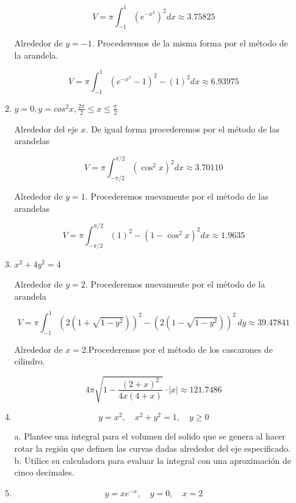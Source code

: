 \documentclass{report}
\begin{document}
\begin{enumerate}[label=\textcolor{Red}{\textbf{\arabic*.}}]
\begin{enumerate}[label=\textcolor{OliveGreen}{\textbf{\arabic*.}}]
                $$
                V=\pi \int_{-1}^{1}\left(e^{-x^{2}}\right)^{2} dx \approx 3.75825
                $$

                Alrededor de $y=-1$. Procederemos de la misma forma por el método de la arandela.

                $$
                V=\pi \int_{-1}^{1}\left(e^{-x^{2}}-1\right)^{2}-(1)^{2} dx \approx 6.93975
                $$

                \item $y = 0, y = cos^2x, \frac{2\pi}{2} \leq x \leq \frac{\pi}{2}$
                
                Alrededor del eje $x$. De igual forma procederemos por el método de las arandelas

                $$
                V=\pi \int_{-\pi / 2}^{\pi / 2}\left(\cos ^{2} x\right)^{2} dx \approx 3.70110
                $$

                Alrededor de $y=1$. Procederemos nuevamente por el método de las arandelas

                $$V = \pi \int_{-\pi / 2}^{\pi / 2}(1)^{2}-\left(1-\cos ^{2} x\right)^{2} dx \approx 1.9635 $$

                \item $x^2 + 4y^2 = 4$
                
                Alrededor de $y=2$. Procederemos nuevamente por el método de la arandela

                $$V = \pi \int_{-1}^{1} \left(2(1 + \sqrt{1-y^2})\right)^{2} - \left(2(1-\sqrt{1-y^2})\right)^{2} \, dy \approx 39.47841$$

                Alrededor de $x = 2$.Procederemos por el método de los cascarones de cilindro.

                $$4 \pi \sqrt{1 - \frac{(2 + x)^2}{4 x (4 + x)}} \cdot |x| \approx 121.7486
                $$

                \item $$
                y=x^{2}, \quad x^{2}+y^{2}=1, \quad y \geq 0
                $$

            a. Plantee una integral para el volumen del solido que se genera al hacer rotar la región que definen las curvas dadas alrededor del eje especificado.
            b. Utilice su calculadora para evaluar la integral con una aproximación de cinco decimales.
                \item $$
                y=x e^{-x}, \quad y=0, \quad x=2
                $$


\end{enumerate}
\end{enumerate}
\end{document}
